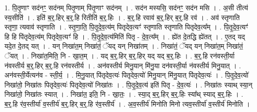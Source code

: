 \documentclass[17pt]{extarticle}
\begin{document}
1. पि॒तृ॒णाꣳ सद॑नꣳ॒॒ सद॑नम् पितृ॒णाम् पि॑तृ॒णाꣳ सद॑नम् । . सद॑न मस्यसि॒ सद॑नꣳ॒॒ सद॑न मसि । . अ॒सी तीत्य॑ स्य॒सीति॑ । . इति॑ ब॒र्॒.हिर् ब॒र्॒.हि रितीति॑ ब॒र्॒.हिः । . ब॒र्॒.हि रवाव॑ ब॒र्॒.हिर् ब॒र्॒.हि रव॑ । . अव॑ स्तृणाति स्तृणा॒ त्यवाव॑ स्तृणाति । . स्तृ॒णा॒ति॒ पि॒तृ॒दे॒व॒त्य॑म् पितृदेव॒त्यꣳ॑ स्तृणाति स्तृणाति पितृदेव॒त्य᳚म् । . पि॒तृ॒दे॒व॒त्यꣳ॑ हि हि पि॑तृदेव॒त्य॑म् पितृदेव॒त्यꣳ॑ हि । . पि॒तृ॒दे॒व॒त्य॑मिति॑ पितृ - दे॒व॒त्य᳚म् । . ह्ये॑त दे॒तद्धि ह्ये॑तत् । . ए॒तद् यद् यदे॒त दे॒तद् यत् । . यन् निखा॑त॒म् निखा॑तं॒ ॅयद् यन् निखा॑तम् । . निखा॑तं॒ ॅयद् यन् निखा॑त॒म् निखा॑तं॒ ॅयत् । . निखा॑त॒मिति॒ नि - खा॒त॒म् । . यद् ब॒र्॒.हिर् ब॒र्॒.हिर् यद् यद् ब॒र्॒.हिः । . ब॒र्॒.हि रन॑वस्ती॒र्या न॑वस्तीर्य ब॒र्॒.हिर् ब॒र्॒.हि रन॑वस्तीर्य । . अन॑वस्तीर्य मिनु॒यान् मि॑नु॒या दन॑वस्ती॒र्या न॑वस्तीर्य मिनु॒यात् । . अन॑वस्ती॒र्येत्यन॑व - स्ती॒र्य॒ । . मि॒नु॒यात् पि॑तृदेव॒त्यः॑ पितृदेव॒त्यो॑ मिनु॒यान् मि॑नु॒यात् पि॑तृदेव॒त्यः॑ । . पि॒तृ॒दे॒व॒त्यो॑ निखा॑तो॒ निखा॑तः पितृदेव॒त्यः॑ पितृदेव॒त्यो॑ निखा॑तः । . पि॒तृ॒दे॒व॒त्य॑ इति॑ पितृ - दे॒व॒त्यः॑ । . निखा॑तः स्याथ् स्या॒न् निखा॑तो॒ निखा॑तः स्यात् । . निखा॑त॒ इति॒ नि - खा॒तः॒ । . स्या॒द् ब॒र्॒.हिर् ब॒र्॒.हिः स्या᳚थ् स्याद् ब॒र्॒.हिः । . ब॒र्॒.हि र॑व॒स्तीर्या॑ व॒स्तीर्य॑ ब॒र्॒.हिर् ब॒र्॒.हि र॑व॒स्तीर्य॑ । . अ॒व॒स्तीर्य॑ मिनोति मिनो त्यव॒स्तीर्या॑ व॒स्तीर्य॑ मिनोति । \newline
\end{document}
